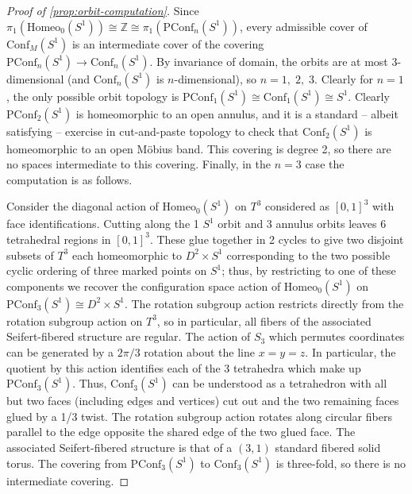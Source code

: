 \documentclass[10pt, oneside]{article}
\newcommand{\Z}{\mathbb{Z}}
\newcommand{\homeo}[1][S^1]{\text{Homeo}_0(#1)}
\newcommand{\conf}[2][S^1]{\text{Conf}_{#2}(#1)}
\newcommand{\pconf}[2][S^1]{\text{PConf}_{#2}(#1)}
\theoremstyle{definition}
\theoremstyle{definition}
\begin{document}
\begin{proof}[Proof of \cref{prop:orbit-computation}]
    Since $\pi_1(\homeo) \cong \Z \cong \pi_1(\pconf[S^1]{n})$, every admissible cover of $\conf[S^1]{M}$ is an intermediate cover of the covering $\pconf[S^1]{n}\to \conf[S^1]{n}$. By invariance of domain, the orbits are at most 3-dimensional (and $\conf[S^1]{n}$ is $n$-dimensional), so $n=1,\; 2,\; 3$. Clearly for $n=1$, the only possible orbit topology is $\pconf[S^1]{1} \cong \conf[S^1]{1}\cong S^1$. Clearly $\pconf[S^1]{2}$ is homeomorphic to an open annulus, and it is a standard -- albeit satisfying -- exercise in cut-and-paste topology to check that $\conf[S^1]{2}$ is homeomorphic to an open M\"{o}bius band. This covering is degree 2, so there are no spaces intermediate to this covering. Finally, in the $n=3$ case the computation is as follows. 

     Consider the diagonal action of $\homeo$ on $T^3$ considered as $[0,1]^3$ with face identifications. Cutting along the 1 $S^1$ orbit and 3 annulus orbits leaves 6 tetrahedral regions in $[0,1]^3$. These glue together in 2 cycles to give two disjoint subsets of $T^3$ each homeomorphic to $D^2 \times S^1$ corresponding to the two possible cyclic ordering of three marked points on $S^1$; thus, by restricting to one of these components we recover the configuration space action of $\homeo$ on $\pconf[S^1]{3}\cong D^2 \times S^1$. The rotation subgroup action restricts directly from the rotation subgroup action on $T^3$, so in particular, all fibers of the associated Seifert-fibered structure are regular. The action of $S_3$ which permutes coordinates can be generated by a $2\pi/3$ rotation about the line $x=y=z$.  In particular, the quotient by this action identifies each of the 3 tetrahedra which make up $\pconf[S^1]{3}$. Thus, $\conf[S^1]{3}$ can be understood as a tetrahedron with all but two faces (including edges and vertices) cut out and the two remaining faces glued by a 1/3 twist. The rotation subgroup action rotates along circular fibers parallel to the edge opposite the shared edge of the two glued face. The associated  Seifert-fibered structure is that of a $(3, 1)$ standard fibered solid torus. The covering from $\pconf[S^1]{3}$ to $\conf[S^1]{3}$ is three-fold, so there is no intermediate covering.
\end{proof}
\end{document}
